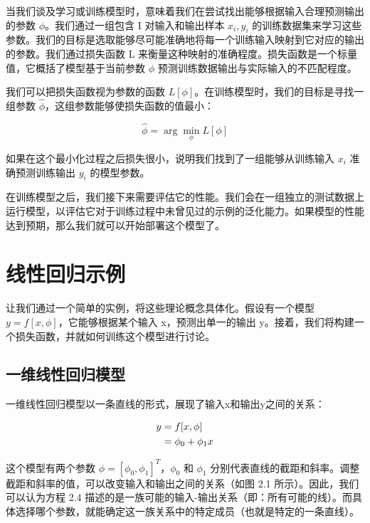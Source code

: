 当我们谈及学习或训练模型时，意味着我们在尝试找出能够根据输入合理预测输出的参数 $\phi$。我们通过一组包含 I 对输入和输出样本 ${x_i, y_i}$ 的训练数据集来学习这些参数。我们的目标是选取能够尽可能准确地将每一个训练输入映射到它对应的输出的参数。我们通过损失函数 L 来衡量这种映射的准确程度。损失函数是一个标量值，它概括了模型基于当前参数 $\phi$ 预测训练数据输出与实际输入的不匹配程度。

我们可以把损失函数视为参数的函数 $L[\phi]$。在训练模型时，我们的目标是寻找一组参数 $\hat \phi$，这组参数能够使损失函数的值最小：

\begin{equation}
\hat \phi = \arg \mathop{\min}\limits_{\phi} L [\phi] 
\end{equation}

如果在这个最小化过程之后损失很小，说明我们找到了一组能够从训练输入 $x_i$ 准确预测训练输出 $y_i$ 的模型参数。

在训练模型之后，我们接下来需要评估它的性能。我们会在一组独立的测试数据上运行模型，以评估它对于训练过程中未曾见过的示例的泛化能力。如果模型的性能达到预期，那么我们就可以开始部署这个模型了。

\section{线性回归示例}

让我们通过一个简单的实例，将这些理论概念具体化。假设有一个模型 $y = f[x, \phi]$，它能够根据某个输入 x，预测出单一的输出 y。接着，我们将构建一个损失函数，并就如何训练这个模型进行讨论。

\subsection{一维线性回归模型}

一维线性回归模型以一条直线的形式，展现了输入x和输出y之间的关系：

\begin{align}
y &= f[x, \phi] \notag \\
&= \phi_0 + \phi_1 x 
\end{align}


这个模型有两个参数 $\phi = [\phi_0,\phi_1]^T$，$\phi_0$ 和 $\phi_1$ 分别代表直线的截距和斜率。调整截距和斜率的值，可以改变输入和输出之间的关系（如图 2.1 所示）。因此，我们可以认为方程 2.4 描述的是一族可能的输入-输出关系（即：所有可能的线）。而具体选择哪个参数，就能确定这一族关系中的特定成员（也就是特定的一条直线）。

